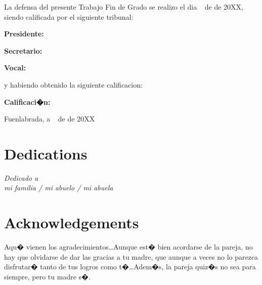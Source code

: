 \documentclass[a4paper, 12pt]{book}
\begin{document}
\vspace{1cm}
La defensa del presente Trabajo Fin de Grado se realizo el dia \qquad$\;\,$ de \qquad\qquad\qquad\qquad \newline de 20XX, siendo calificada por el siguiente tribunal:


\vspace{0.5cm}
\textbf{Presidente:}

\vspace{1.2cm}
\textbf{Secretario:}

\vspace{1.2cm}
\textbf{Vocal:}


\vspace{1.2cm}
y habiendo obtenido la siguiente calificacion:

\vspace{1cm}
\textbf{Calificaci�n:}


\vspace{1cm}
\begin{flushright}
Fuenlabrada, a \qquad$\;\,$ de \qquad\qquad\qquad\qquad de 20XX
\end{flushright}


\chapter*{Dedications}
\begin{flushright}
\textit{Dedicado a \\
mi familia / mi abuelo / mi abuela}
\end{flushright}


\chapter*{Acknowledgements}

Aqu� vienen los agradecimientos\ldots Aunque est� bien acordarse de la pareja,
no hay que olvidarse de dar las gracias a tu madre, que aunque a veces no lo
parezca disfrutar� tanto de tus logros como t�\ldots Adem�s, la pareja quiz�s
no sea para siempre, pero tu madre s�.
\end{document}
